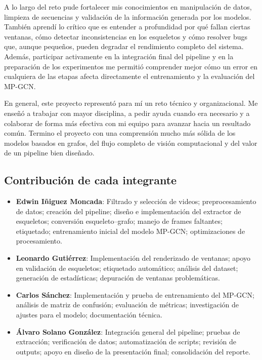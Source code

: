 \documentclass{article}
\begin{document}
A lo largo del reto pude fortalecer mis conocimientos en manipulación de datos, limpieza de secuencias y validación de la información generada por los modelos. También aprendí lo crítico que es entender a profundidad por qué fallan ciertas ventanas, cómo detectar inconsistencias en los esqueletos y cómo resolver bugs que, aunque pequeños, pueden degradar el rendimiento completo del sistema. Además, participar activamente en la integración final del pipeline y en la preparación de los experimentos me permitió comprender mejor cómo un error en cualquiera de las etapas afecta directamente el entrenamiento y la evaluación del MP-GCN.

En general, este proyecto representó para mí un reto técnico y organizacional. Me enseñó a trabajar con mayor disciplina, a pedir ayuda cuando era necesario y a colaborar de forma más efectiva con mi equipo para avanzar hacia un resultado común. Termino el proyecto con una comprensión mucho más sólida de los modelos basados en grafos, del flujo completo de visión computacional y del valor de un pipeline bien diseñado.

\subsection{Contribución de cada integrante}

\begin{itemize}
    \item \textbf{Edwin Iñiguez Moncada}: Filtrado y selección de videos; preprocesamiento de datos; creación del pipeline; diseño e implementación del extractor de esqueletos; conversión esqueleto–grafo; manejo de frames faltantes; etiquetado; entrenamiento inicial del modelo MP-GCN; optimizaciones de procesamiento.
    \item \textbf{Leonardo Gutiérrez}: Implementación del renderizado de ventanas; apoyo en validación de esqueletos; etiquetado automático; análisis del dataset; generación de estadísticas; depuración de ventanas problemáticas.
    \item \textbf{Carlos Sánchez}: Implementación y prueba de entrenamiento del MP-GCN; análisis de matriz de confusión; evaluación de métricas; investigación de ajustes para el modelo; documentación técnica.
    \item \textbf{Álvaro Solano González}: Integración general del pipeline; pruebas de extracción; verificación de datos; automatización de scripts; revisión de outputs; apoyo en diseño de la presentación final; consolidación del reporte.
\end{itemize}
\end{document}

